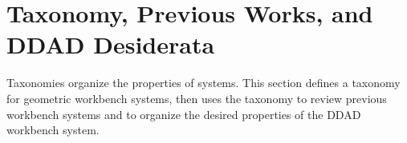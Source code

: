\section{Taxonomy, Previous Works, and DDAD Desiderata}
\label{sec:taxonomy-previousworks-desiderata}


Taxonomies organize the properties of systems. This section defines a taxonomy
for geometric workbench systems, then uses the taxonomy to review previous
workbench systems and to organize the desired properties of the DDAD workbench
system.

% 


